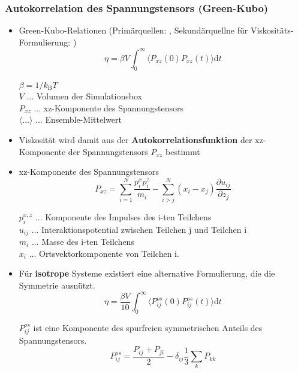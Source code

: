 \documentclass[a4paper, 10pt, 
               numbers=noenddot, toc=graduated,
               headsepline=true, footsepline=true,
               twoside=false, titlepage=true, 
               bibliography=totoc]{scrartcl}
\begin{document}
	\subsubsection{Autokorrelation des Spannungstensors (Green-Kubo)}
		\begin{itemize}
			 \item Green-Kubo-Relationen (Primärquellen: \cite{Green1954,Kubo1957}, Sekundärquellne für Viskositäts-Formulierung: \cite{Kirova2015,Tenney2010})
			 	\begin{equation}\label{eqn:green_kubo}
			 		\eta = \beta V \int_0^\infty \langle P_{xz}(0) P_{xz}(t) \rangle \mathrm{d} t 
				\end{equation}			 
				
				$\beta = 1/k_\mathrm{B} T$\\
				$V$ ... Volumen der Simulationsbox\\
				$P_{xz}$ ... xz-Komponente des Spannungstensors\\
				$\langle \ldots \rangle$ ... Ensemble-Mittelwert
			 
		 	\item Viskosität wird damit aus der \textbf{Autokorrelationsfunktion} der xz-Komponente der Spannungstensors $P_{xz}$ bestimmt
		 	\item xz-Komponente des Spannungstensors \cite{Kirova2015}
		 		\begin{equation}
					P_{xz} = \sum_{i=1}^N \frac{p_i^x p_i^z}{m_i} - \sum_{i>j}^N (x_i - x_j) \frac{\partial u_{ij} }{\partial z_j}	 	
			 	\end{equation}
			 	
			 	$p_i^{x,z}$ ... Komponente des Impulses des i-ten Teilchens\\ 
			 	$u_{ij}$ ... Interaktionspotential zwischen Teilchen j und Teilchen i\\
			 	$m_i$ ... Masse des i-ten Teilchens\\
			 	$x_i$ ... Ortsvektorkomponente von Teilchen i.
			 	
			\item Für \textbf{isotrope} Systeme existiert eine alternative Formulierung, die die Symmetrie ausnützt\cite{Tenney2010,Daivis1994}.
				\begin{equation}
					\eta = \frac{\beta V}{10} \int_0^\infty \langle P_{ij}^{os}(0) P_{ij}^{os}(t) \rangle \mathrm{d} t
				\end{equation}
			   
			    $P_{ij}^{os}$ ist eine Komponente des spurfreien symmetrischen Anteils des Spannungstensors.
			    \begin{equation}
			    	P_{ij}^{os} = \frac{P_{ij} + P_{ji} }{2} - \delta_{ij} \frac 1 3 \sum_k P_{kk}
			    \end{equation}
			    

\end{itemize}
\end{document}
